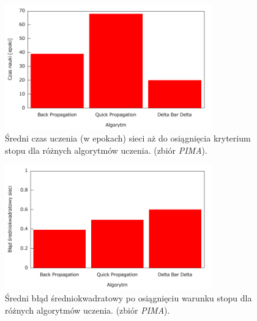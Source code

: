 \begin{figure}[h]
\centering
\includegraphics[width=0.8\textwidth]{dane/part1/zad10/epochs-pima}
\caption{Średni czas uczenia (w epokach) sieci aż do osiągnięcia kryterium stopu dla różnych algorytmów uczenia. (zbiór \emph {PIMA}).\label{fig:epochs-pima}}
\end{figure}

\begin{figure}[h]
\centering
\includegraphics[width=0.8\textwidth]{dane/part1/zad10/epochs-pima-errors}
\caption{Średni błąd średniokwadratowy po osiągnięciu warunku stopu dla różnych algorytmów uczenia. (zbiór \emph {PIMA}).\label{fig:errors-pima}}
\end{figure}


